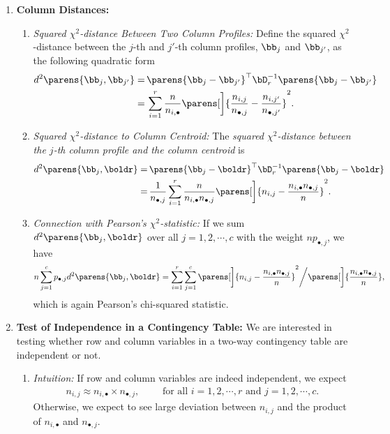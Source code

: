 \documentclass[12pt]{article}
\begin{document}
\begin{enumerate}[label=\textbf{\arabic*.}]
	\item \textbf{Column Distances:} 
	\begin{enumerate}
		\item \textit{Squared $\chi^2$-distance Between Two Column Profiles:} Define the squared $\chi^2$-distance between the $j$-th and $j'$-th column profiles, $\bb_j$ and $\bb_{j'}$, as the following quadratic form 
		\begin{align*}
			d^2 \parens{\bb_j, \bb_{j'}} = & \, \parens{\bb_j - \bb_{j'}}^\top \bD_r^{-1} \parens{\bb_j - \bb_{j'}} \\ 
			= & \, \sum_{i=1}^r \frac{n}{n_{i,\bullet}} \parens[\bigg]{\frac{n_{i,j}}{n_{\bullet, j}} - \frac{n_{i,j'}}{n_{\bullet, j'}}}^2. 
		\end{align*}
		
		\item \textit{Squared $\chi^2$-distance to Column Centroid:} The \emph{squared $\chi^2$-distance between the $j$-th column profile and the column centroid} is 
		\begin{align*}
			d^2 \parens{\bb_j, \boldr} = & \, \parens{\bb_j - \boldr}^\top \bD_r^{-1} \parens{\bb_j - \boldr} \\ 
			= & \, \frac{1}{n_{\bullet, j}} \sum_{i=1}^r \frac{n}{n_{i,\bullet} n_{\bullet, j} } \parens[\bigg]{n_{i,j} - \frac{n_{i,\bullet} n_{\bullet, j}}{n}}^2. 
		\end{align*}
		
		\item \textit{Connection with Pearson's $\chi^2$-statistic:} If we sum $d^2 \parens{\bb_j, \boldr}$ over all $j = 1, 2, \cdots, c$ with the weight $np_{\bullet,j}$, we have 
		\begin{align*}
			n \sum_{j=1}^c p_{\bullet,j} d^2 \parens{\bb_j, \boldr} = \sum_{i=1}^r \sum_{j=1}^c \parens[\bigg]{n_{i,j} - \frac{n_{i,\bullet} n_{\bullet,j}}{n}}^2 \bigg/ \parens[\bigg]{\frac{n_{i,\bullet} n_{\bullet,j}}{n}}, 
		\end{align*}
		which is again Pearson's chi-squared statistic. 
		
	\end{enumerate}
	
	\item \textbf{Test of Independence in a Contingency Table:} We are interested in testing whether row and column variables in a two-way contingency table are independent or not. 
	\begin{enumerate}
		\item \textit{Intuition:} If row and column variables are indeed independent, we expect 
		\begin{align*}
			n_{i, j} \approx n_{i, \bullet} \times n_{\bullet, j}, \qquad \text{ for all } i = 1, 2, \cdots, r \text{ and } j = 1, 2, \cdots, c. 
		\end{align*}
		Otherwise, we expect to see large deviation between $n_{i, j}$ and the product of $n_{i, \bullet}$ and $n_{\bullet, j}$. 
		

\end{enumerate}
\end{enumerate}
\end{document}
